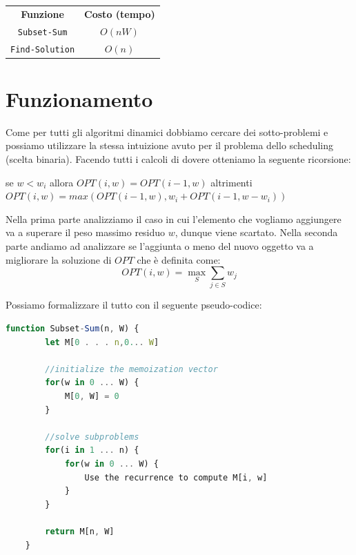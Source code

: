 \begin{center}
    \begin{tabular}{|c|c|}
        \centering
        \textbf{Funzione}    & \textbf{Costo (tempo)} \\
        \verb|Subset-Sum|    & $O(nW)$                \\
        \verb|Find-Solution| & $O(n)$                 \\
    \end{tabular}
\end{center}

\section{Funzionamento}

Come per tutti gli algoritmi dinamici dobbiamo cercare dei sotto-problemi e
possiamo utilizzare la stessa intuizione avuto per il problema dello scheduling
(scelta binaria). Facendo tutti i calcoli di dovere otteniamo la seguente
ricorsione:

\begin{center}
    se $w < w_i$ allora $OPT(i, w) = OPT(i-1,w)$ altrimenti\\
    $OPT(i, w) = max(OPT(i-1, w), w_i + OPT(i-1, w-w_i))$
\end{center}

Nella prima parte analizziamo il caso in cui l'elemento che vogliamo aggiungere va
a superare il peso massimo residuo $w$, dunque viene scartato. Nella seconda parte
andiamo ad analizzare se l'aggiunta o meno del nuovo oggetto va a migliorare
la soluzione di $OPT$ che è definita come:\\

\[
    OPT(i, w) = \max_{S} \sum_{j \in S} w_j
\]
\newpage

Possiamo formalizzare il tutto con il seguente pseudo-codice:

\begin{lstlisting}[language=JavaScript]
    function Subset-Sum(n, W) {
        let M[0 . . . n,0... W]

        //initialize the memoization vector
        for(w in 0 ... W) {
            M[0, W] = 0
        }

        //solve subproblems
        for(i in 1 ... n) {
            for(w in 0 ... W) {
                Use the recurrence to compute M[i, w]
            }
        }

        return M[n, W]
    }
\end{lstlisting}

